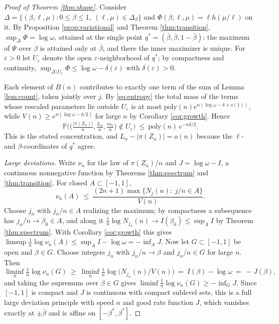 \documentclass[11pt]{amsart}
\theoremstyle{definition}
\theoremstyle{remark}
\newcommand{\Prob}{\mathbb{P}}
\begin{document}
\begin{proof}[Proof of Theorem \ref{thm:shape}]
Consider $\Delta=\{(\beta,\ell,\mu):0\le\beta\le1,\ (\ell,\mu)\in\Delta_\beta\}$ and $\Phi(\beta,\ell,\mu)=\ell h(\mu/\ell)$ on it. By Proposition \ref{prop:variational} and Theorem \ref{thm:transition}, $\sup_\Delta\Phi=\log\omega$, attained at the single point $q^{*}=(\bar\beta,\bar\beta,1-\bar\beta)$: the maximum of $\Psi$ over $\beta$ is attained only at $\bar\beta$, and there the inner maximizer is unique. For $\varepsilon>0$ let $U_\varepsilon$ denote the open $\varepsilon$-neighborhood of $q^{*}$; by compactness and continuity, $\sup_{\Delta\setminus U_\varepsilon}\Phi\le\log\omega-\delta(\varepsilon)$ with $\delta(\varepsilon)>0$.

Each element of $B(n)$ contributes to exactly one term of the sum of Lemma \ref{lem:count}, taken jointly over $j$. By \eqref{eq:entropy} the total mass of the terms whose rescaled parameters lie outside $U_\varepsilon$ is at most $\mathrm{poly}(n)e^{n(\log\omega-\delta+o(1))}$, while $V(n)\ge e^{n(\log\omega-\delta/2)}$ for large $n$ by Corollary \ref{cor:growth}. Hence
\[
\Prob\Big(\big(\tfrac{|\pi(Z_n)|}n,\tfrac{L_n}n,\tfrac{m_n}n\big)\notin U_\varepsilon\Big)\ \le\ \mathrm{poly}(n)\,e^{-n\delta/2}.
\]
This is the stated concentration, and $L_n-|\pi(Z_n)|=o(n)$ because the $\ell$- and $\beta$-coordinates of $q^{*}$ agree.

\emph{Large deviations.} Write $\nu_n$ for the law of $\pi(Z_n)/n$ and $J=\log\omega-I$, a continuous nonnegative function by Theorems \ref{thm:spectrum} and \ref{thm:transition}. For closed $A\subset[-1,1]$,
\[
\nu_n(A)\ \le\ \frac{(2n+1)\max\{N_j(n):\ j/n\in A\}}{V(n)} .
\]
Choose $j_n$ with $j_n/n\in A$ realizing the maximum; by compactness a subsequence has $j_n/n\to\beta_0\in A$, and along it $\frac1n\log N_{j_n}(n)\to I(\beta_0)\le\sup_{A}I$ by Theorem \ref{thm:spectrum}. With Corollary \ref{cor:growth} this gives
$\limsup\frac1n\log\nu_n(A)\le\sup_A I-\log\omega=-\inf_A J$.
Now let $G\subset[-1,1]$ be open and $\beta\in G$. Choose integers $j_n$ with $j_n/n\to\beta$ and $j_n/n\in G$ for large $n$. Then
\[
\liminf_n\tfrac1n\log\nu_n(G)\ \ge\ \liminf_n\tfrac1n\log\big(N_{j_n}(n)/V(n)\big)\ =\ I(\beta)-\log\omega\ =\ -J(\beta),
\]
and taking the supremum over $\beta\in G$ gives $\liminf\frac1n\log\nu_n(G)\ge-\inf_G J$. Since $[-1,1]$ is compact and $J$ is continuous with compact sublevel sets, this is a full large deviation principle with speed $n$ and good rate function $J$, which vanishes exactly at $\pm\bar\beta$ and is affine on $[-\beta^{*},\beta^{*}]$.
\end{proof}
\end{document}
